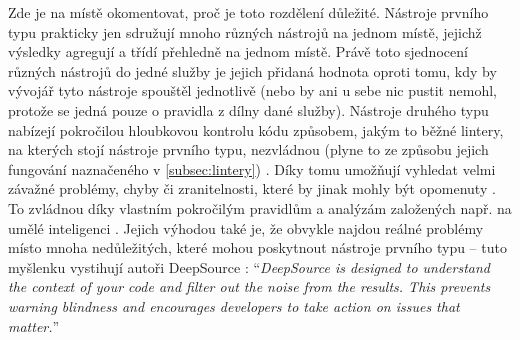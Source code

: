 Zde je na místě okomentovat, proč je toto rozdělení důležité. Nástroje prvního typu prakticky jen sdružují mnoho různých nástrojů na jednom místě, jejichž výsledky agregují a třídí přehledně na jednom místě. Právě toto sjednocení různých nástrojů do jedné služby je jejich přidaná hodnota oproti tomu, kdy by vývojář tyto nástroje spouštěl jednotlivě (nebo by ani u sebe nic pustit nemohl, protože se jedná pouze o pravidla z dílny dané služby). Nástroje druhého typu nabízejí pokročilou hloubkovou kontrolu kódu způsobem, jakým to běžné lintery, na kterých stojí nástroje prvního typu, nezvládnou (plyne to ze způsobu jejich fungování naznačeného v \ref{subsec:lintery}) \cite{deepscan-lintercompare}. Díky tomu umožňují vyhledat velmi závažné problémy, chyby či zranitelnosti, které by jinak mohly být opomenuty \cite{deepscan-lintercompare, deepsource2}. To zvládnou díky vlastním pokročilým pravidlům a analýzám založených např. na umělé inteligenci \cite{deepsource2}. Jejich výhodou také je, že obvykle najdou reálné problémy místo mnoha nedůležitých, které mohou poskytnout nástroje prvního typu -- tuto myšlenku vystihují autoři DeepSource \cite{deepsource2}: \enquote{\textit{DeepSource is designed to understand the context of your code and filter out the noise from the results. This prevents warning blindness and encourages developers to take action on issues that matter.}}

